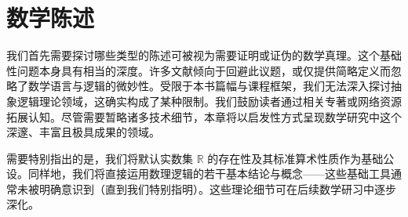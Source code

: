\section{数学陈述}

我们首先需要探讨哪些类型的陈述可被视为需要证明或证伪的数学真理。这个基础性问题本身具有相当的深度。许多文献倾向于回避此议题，或仅提供简略定义而忽略了数学语言与逻辑的微妙性。受限于本书篇幅与课程框架，我们无法深入探讨抽象逻辑理论领域，这确实构成了某种限制。我们鼓励读者通过相关专著或网络资源拓展认知。尽管需要暂略诸多技术细节，本章将以启发性方式呈现数学研究中这个深邃、丰富且极具成果的领域。

需要特别指出的是，我们将默认实数集 $\mathbb{R}$ 的存在性及其标准算术性质作为基础公设。同样地，我们将直接运用数理逻辑的若干基本结论与概念——这些基础工具通常未被明确意识到（直到我们特别指明）。这些理论细节可在后续数学研习中逐步深化。









